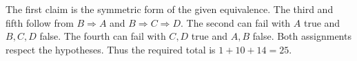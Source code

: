 The first claim is the symmetric form of the given equivalence. The third and fifth follow from $B\Rightarrow A$ and $B\Rightarrow C\Rightarrow D$. The second can fail with $A$ true and $B,C,D$ false. The fourth can fail with $C,D$ true and $A,B$ false. Both assignments respect the hypotheses. Thus the required total is $1+10+14=\boxed{25}$.

